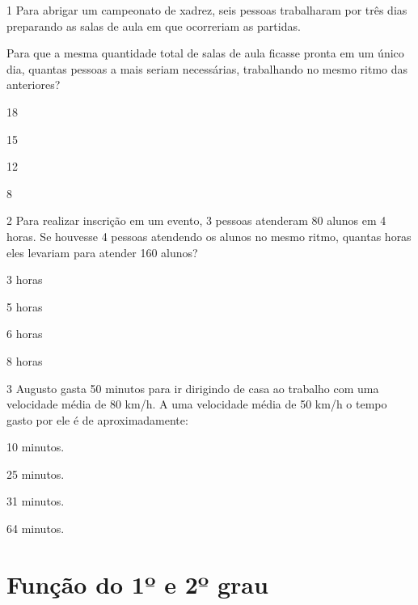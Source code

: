 \num{1} Para abrigar um campeonato de xadrez, seis pessoas trabalharam por 
três dias preparando as salas de aula em que ocorreriam as partidas.

Para que a mesma quantidade total de salas de aula ficasse pronta em um
único dia, quantas pessoas a mais seriam necessárias, trabalhando no mesmo 
ritmo das anteriores?

\begin{escolha}

  \item 18

  \item 15

  \item 12

  \item 8

\end{escolha}

\num{2} Para realizar inscrição em um evento, 3 pessoas atenderam 80 alunos
em 4 horas. Se houvesse 4 pessoas atendendo os alunos no mesmo ritmo, quantas
horas eles levariam para atender 160 alunos?

\begin{escolha}
  \item 3 horas

  \item 5 horas

  \item 6 horas

  \item 8 horas
\end{escolha}

\num{3} Augusto gasta 50 minutos para ir dirigindo de casa ao trabalho com
uma velocidade média de 80 km/h. A uma velocidade média de 50 km/h o tempo
gasto por ele é de aproximadamente:

\begin{escolha}

  \item 10 minutos.

  \item 25 minutos.

  \item 31 minutos.

  \item 64 minutos.

\end{escolha}


\chapter{Função do 1º e 2º grau}

